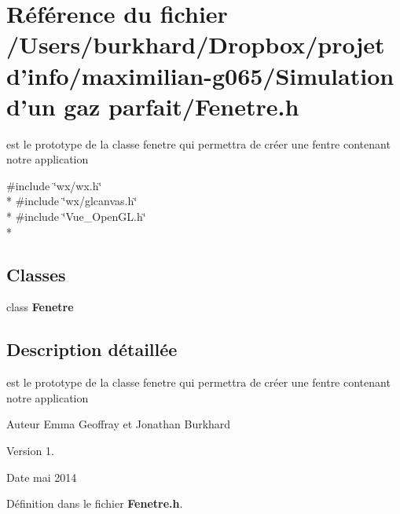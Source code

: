 \section{Référence du fichier /\+Users/burkhard/\+Dropbox/projet d'info/maximilian-\/g065/\+Simulation d'un gaz parfait/\+Fenetre.h}
\label{_fenetre_8h}


est le prototype de la classe fenetre qui permettra de créer une fentre contenant notre application  


{\ttfamily \#include \char`\"{}wx/wx.\+h\char`\"{}}\\*
{\ttfamily \#include \char`\"{}wx/glcanvas.\+h\char`\"{}}\\*
{\ttfamily \#include \char`\"{}Vue\+\_\+\+Open\+G\+L.\+h\char`\"{}}\\*
\subsection*{Classes}
\begin{DoxyCompactItemize}
\item 
class {\bf Fenetre}
\end{DoxyCompactItemize}


\subsection{Description détaillée}
est le prototype de la classe fenetre qui permettra de créer une fentre contenant notre application 

\begin{DoxyAuthor}{Auteur}
Emma Geoffray et Jonathan Burkhard 
\end{DoxyAuthor}
\begin{DoxyVersion}{Version}
1. 
\end{DoxyVersion}
\begin{DoxyDate}{Date}
mai 2014 
\end{DoxyDate}


Définition dans le fichier {\bf Fenetre.\+h}.

